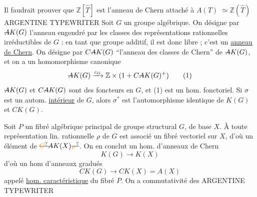 Il faudrait prouver que
$\mathbb Z[\widehat T]$ est l'anneau de
Chern attaché à $A(T)$
$\simeq\mathbb Z(\widehat T)$
 ARGENTINE  TYPEWRITER  
Soit $G$ un groupe algébrique. On désigne par $\deleted{A}K(G)$
l'anneau  engendré par les classes des représentations
rationnelles irréductibles de $G$ : en tant que groupe
additif, il est donc libre ; c'est un \uline{anneau}
\uline{de Chern}. On désigne par $C\deleted{A}K(G)$ ``l'anneau
des classes de Chern'' de $\deleted{A}K(G)$,  
et on a un homomorphisme canonique
\[
\deleted{A}K(G)\xrightarrow{c_G}\mathbb Z\times(1+C\deleted{A}K(G)^+) \tag*{(1)}
\]
$\deleted{A}K(G)$ et $C\deleted{A}K(G)$ sont des foncteurs en $G$, et
(1) est un hom. fonctoriel. Si $\sigma$ est un
autom. \uline{intérieur} de $G$, alors $\sigma^*$ est l'automorphisme identique de $K(G)$ et $CK(G)$.

Soit $P$ un fibré algébrique principal de
groupe structural $G$, de base $X$. À toute
 représentation lin. rationnelle $\rho$ de $G$
est associé un fibré vectoriel  sur $X$, d'où
un élément de $\deleted{\unsure{C}}\deleted{A}K(X)\deleted{\unsure{{}_P}}$. On en
conclut un hom. d'anneaux de Chern
\[
K(G)\longrightarrow K(X)
\]
d'où un hom d'anneaux gradués
\[
CK(G)\longrightarrow CK(X)=A(X) \tag*{(2)}
\]
appelé \uline{hom. caractéristique} du fibré $P$. On
a commutativité des
  ARGENTINE  TYPEWRITER  

